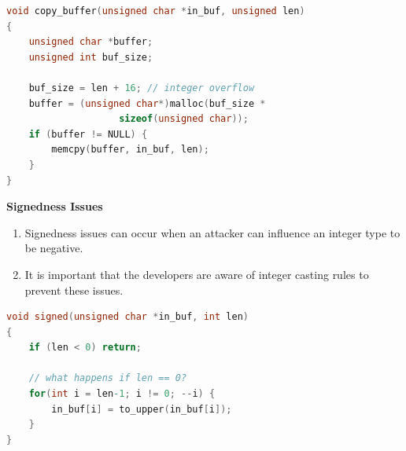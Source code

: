 \documentclass[12pt]{Training}
\begin{document}
\begin{sectionbox}
\begin{lstlisting}[language=C, caption={Integer Overflow Code}]
void copy_buffer(unsigned char *in_buf, unsigned len)
{
	unsigned char *buffer;
	unsigned int buf_size;

	buf_size = len + 16; // integer overflow
	buffer = (unsigned char*)malloc(buf_size *
					sizeof(unsigned char));
	if (buffer != NULL) {
		memcpy(buffer, in_buf, len);
	}
}
\end{lstlisting}
\end{sectionbox}

\textbf{Signedness Issues}
\begin{enumerate}
    \item Signedness issues can occur when an attacker can influence an integer type to be negative.
    \item It is important that the developers are aware of integer casting rules to prevent these issues.
\end{enumerate}

\begin{sectionbox}
\begin{lstlisting}[language=C, caption={Signedness Issues}]
void signed(unsigned char *in_buf, int len)
{
    if (len < 0) return;

    // what happens if len == 0?
    for(int i = len-1; i != 0; --i) {
        in_buf[i] = to_upper(in_buf[i]);
    }
}
\end{lstlisting}
\end{sectionbox}
\end{document}
